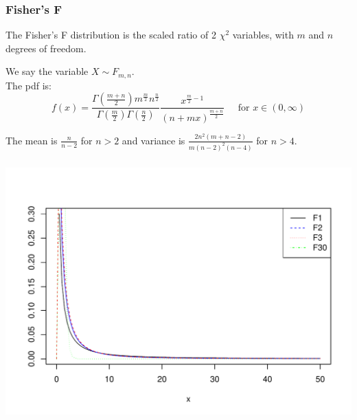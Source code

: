 \documentclass[t,xcolor=pdftex,dvipsnames,table]{beamer}
\makeatletter
\def\maxwidth{ %
  \ifdim\Gin@nat@width>\linewidth
    \linewidth
  \else
    \Gin@nat@width
  \fi
}
\newenvironment{knitrout}{}{} %
\makeatother
\begin{document}
\begin{frame}\frametitle{Fisher's F}

\begin{definition}
The \alert{Fisher's F distribution} is the scaled ratio of 2 $\chi^2$ variables, with $m$ and $n$ degrees of freedom.

\vspace{.5cm}
We say the variable $X \sim F_{m,n}$. \\

\vspace{.5cm}
The pdf is:
\[ f(x)  =  \frac{ \Gamma( \frac{m+n}{2} ) m^{\frac{m}{2}}  n^{\frac{n}{2}}   }{ \Gamma( \frac{m}{2} )  \Gamma( \frac{n}{2} )}
\frac{ x^{\frac{m}{2}-1}  }{ (n + mx)^{\frac{m+n}{2}}      }
\;\;\;\;\; \mbox{for }  x \in (0, \infty) \]



\vspace{.5cm}
The mean is $\frac{n}{n-2}$ for $n >2$ and variance is $\frac{2 n^2 (m+n-2)}{m (n-2)^2(n-4)}$ for $n > 4$.



\end{definition}

\end{frame}


\begin{frame}[fragile]\frametitle{}

\begin{knitrout}
\color{fgcolor}
\includegraphics[width=\maxwidth]{figure/unnamed-chunk-25-1} 

\end{knitrout}
\end{frame}
\end{document}
